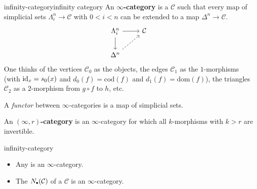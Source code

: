 \begin{topic}{infinity-category}{infinity category}
    An \textbf{$\infty$-category} is a  $\mathcal{C}$ such that every map of simplicial sets $\Lambda^n_i \to \mathcal{C}$ with $0 < i < n$ can be extended to a map $\Delta^n \to \mathcal{C}$.
    \[ \begin{tikzcd} \Lambda^n_i \arrow{r} \arrow{d} & \mathcal{C} \\ \Delta^n \arrow[dashed]{ur} & \end{tikzcd} \]
    One thinks of the vertices $\mathcal{C}_0$ as the objects, the edges $\mathcal{C}_1$ as the $1$-morphisms (with $\text{id}_x = s_0(x)$ and $d_0(f) = \text{cod}(f)$ and $d_1(f) = \text{dom}(f)$), the triangles $\mathcal{C}_2$ as a $2$-morphism from $g \circ f$ to $h$, etc.
    
    A \textit{functor} between $\infty$-categories is a map of simplicial sets.
    
    An \textbf{$(\infty, r)$-category} is an $\infty$-category for which all $k$-morphisms with $k > r$ are invertible.
\end{topic}

\begin{example}{infinity-category}
    \begin{itemize}
        \item Any  is an $\infty$-category.
        \item The  $N_\bdot(\mathcal{C})$ of a  $\mathcal{C}$ is an $\infty$-category.
    \end{itemize}
\end{example}

